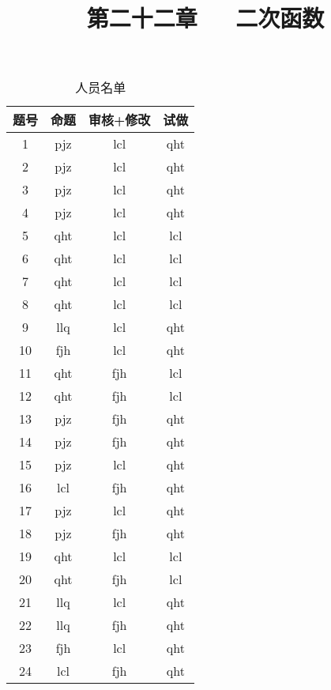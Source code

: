 \documentclass[11pt]{article}
\title{\heiti 第二十二章~~~二次函数}
\date{}
\author{}
\begin{document}
\maketitle
\begin{table}[htbp]
  \centering
  \caption{人员名单}
    \begin{tabular}{cccc}
    \toprule
    题号         & 命题          & 审核+修改       & 试做 \\
    \midrule
    1           & pjz         & lcl         & qht \\
    \midrule
    2           & pjz         & lcl         & qht \\
    \midrule
    3           & pjz         & lcl         & qht \\
    \midrule
    4           & pjz         & lcl         & qht \\
    \midrule
    5           & qht         & lcl         & lcl \\
    \midrule
    6           & qht         & lcl         & lcl \\
    \midrule
    7           & qht         & lcl         & lcl \\
    \midrule
    8           & qht         & lcl         & lcl \\
    \midrule
    9           & llq         & lcl         & qht \\
    \midrule
    10          & fjh         & lcl         & qht \\
    \midrule
    11          & qht         & fjh         & lcl \\
    \midrule
    12          & qht         & fjh         & lcl \\
    \midrule
    13          & pjz         & fjh         & qht \\
    \midrule
    14          & pjz         & fjh         & qht \\
    \midrule
    15          & pjz         & lcl         & qht \\
    \midrule
    16          & lcl         & fjh         & qht \\
    \midrule
    17          & pjz         & lcl         & qht \\
    \midrule
    18          & pjz         & fjh         & qht \\
    \midrule
    19          & qht         & lcl         & lcl \\
    \midrule
    20          & qht         & fjh         & lcl \\
    \midrule
    21          & llq         & lcl         & qht \\
    \midrule
    22          & llq         & fjh         & qht \\
    \midrule
    23          & fjh         & lcl         & qht \\
    \midrule
    24          & lcl         & fjh         & qht \\
    \bottomrule
    \end{tabular}%
\end{table}%
\end{document}
